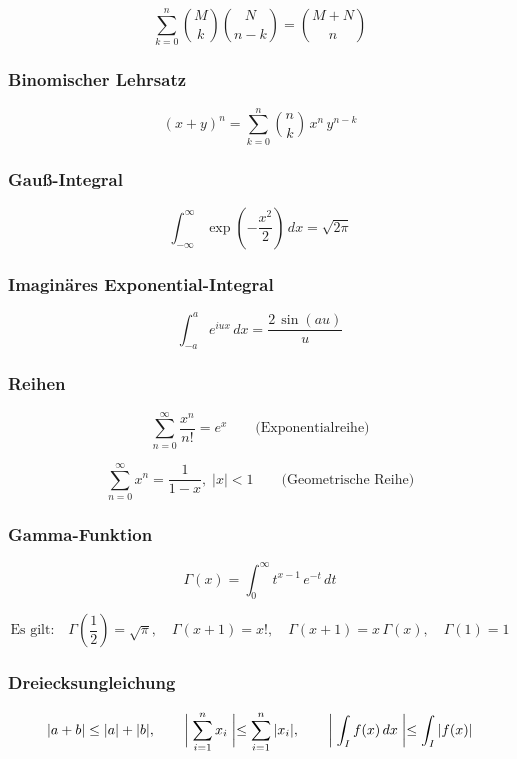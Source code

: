 \documentclass{article}
\begin{document}
\[ \sum_{k=0}^n \binom{M}{k} \binom{N}{n-k} = \binom{M+N}{n} \]

\subsubsection*{Binomischer Lehrsatz}

\[ (x+y)^n = \sum_{k=0}^n \binom{n}{k}\, x^n\, y^{n-k} \]

\subsubsection*{Gauß-Integral}

\[ \int_{-\infty}^{\infty} \exp\left( -\frac{x^2}{2} \right)\, dx = \sqrt{2\pi} \]

\subsubsection*{Imaginäres Exponential-Integral}

\[ \int_{-a}^{a} e^{iux}\, dx = \frac{2\, \sin(au)}{u} \]

\subsubsection*{Reihen}

\[ \sum_{n=0}^{\infty} \frac{x^n}{n!} = e^x \qquad \text{(Exponentialreihe)}\]

\[ \sum_{n=0}^{\infty} x^n = \frac{1}{1-x},\; |x|<1 \qquad \text{(Geometrische Reihe)} \]

\subsubsection*{Gamma-Funktion}

\[ \Gamma(x) = \int_0^{\infty} t^{x-1}\,e^{-t}\,dt \]

\[ \text{Es gilt:} \quad \Gamma(\frac{1}{2}) = \sqrt{\pi}, \quad \Gamma(x+1) = x!, \quad \Gamma(x+1) = x\,\Gamma(x), \quad \Gamma(1) = 1 \]

\subsubsection*{Dreiecksungleichung}

\[ |a+b| \le |a| + |b|, \qquad \biggm| \sum_{i=1}^n x_i \biggm| \le \sum_{i=1}^n |x_i|, \qquad \biggm| \int_I f(x)\,dx \biggm| \le \int_I |f(x)| \]
\end{document}
